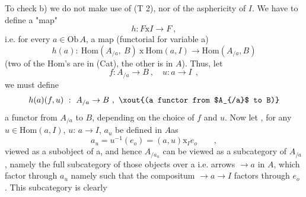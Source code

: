 To check b) we do not make use of  (T 2),  nor of the asphericity of
$I$.  We have to define a "map"
\[ h\colon F\mathrm{x}I\to F\ , \]
i.e. for every $a\in\mathrm{Ob}\,A$,  a map (functorial for variable a)
\[ h(a)\colon\ \mathrm{Hom}(A_{/a},\ B)\ \mathrm{x}\ \mathrm{Hom}(a,I)\longrightarrow \mathrm{Hom}(A_{/a},B) \]
(two of the Hom's are in (Cat), the other is in $A\hat{}$).  Thus,  let
\[ f\colon A_{/a}\to B\ ,\quad u\colon a\longrightarrow I\ \ , \]
we must define
\[ h(a)(f,u)\ :\ A_{/a}\to B\ ,\ \xout{(a functor from $A_{/a}$ to B)} \]
a functor from $A_{/a}$ to $B$,  depending on the choice of $f$ and $u$.  Now let ,
for any  $u\in\mathrm{Hom}(a,I)$,  $u$: $a\to I$,  $a_u$ be defined in $A\hat{}$\hand{/}as
\[ a_u = u^{-1}(e_o) = (a,u)\mathrm{x}_I e_o\qquad , \]
viewed as a subobject of a,  and hence $A_{/a_u}$  can be viewed as a subcategory
of $A_{/a}$ ,  namely the  full subcategory of those  objects  over a
i.e. arrows $\to a$ in $A$,  which factor through $a_u$ namely such that the
compositum  $\to a\to I$  factors through $e_o$ .  This subcategory is clearly

